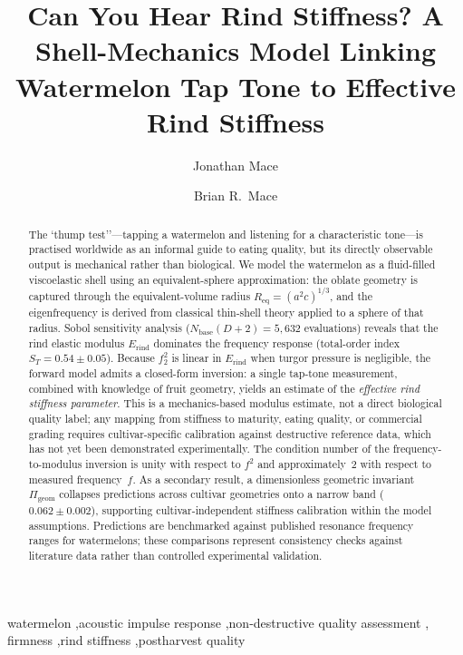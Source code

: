 \documentclass[review]{elsarticle}
\begin{document}
\begin{frontmatter}

\title{Can You Hear Rind Stiffness? A Shell-Mechanics Model Linking
Watermelon Tap Tone to Effective Rind Stiffness}

\author[msr]{Jonathan Mace}

\author[auckland]{Brian R.\ Mace}



\begin{abstract}
The `thump test''---tapping a watermelon and listening for a
characteristic tone---is practised worldwide as an informal guide to
eating quality, but its directly observable output is mechanical rather
than biological.  We model the watermelon as a fluid-filled
viscoelastic shell using an equivalent-sphere approximation: the oblate
geometry is captured through the equivalent-volume radius
$R_{\mathrm{eq}} = (a^{2}c)^{1/3}$, and the eigenfrequency is derived
from classical thin-shell theory applied to a sphere of that radius.
Sobol sensitivity analysis ($N_{\mathrm{base}}(D{+}2) = 5{,}632$
evaluations) reveals that the rind elastic modulus
$E_{\mathrm{rind}}$ dominates the frequency response (total-order
index $S_T = 0.54 \pm 0.05$).  Because $f_2^2$ is linear in
$E_{\mathrm{rind}}$ when turgor pressure is negligible, the forward
model admits a closed-form inversion: a single tap-tone measurement,
combined with knowledge of fruit geometry, yields an estimate of the
\emph{effective rind stiffness parameter}.  This is a mechanics-based
modulus estimate, not a direct biological quality label; any mapping from
stiffness to maturity, eating quality, or commercial grading requires
cultivar-specific calibration against destructive reference data, which
has not yet been demonstrated experimentally.  The condition number of
the frequency-to-modulus inversion is unity with respect to $f^2$ and
approximately~2 with respect to measured frequency~$f$.  As a
secondary result, a dimensionless geometric invariant
$\Pi_{\mathrm{geom}}$ collapses predictions across cultivar geometries
onto a narrow band ($0.062 \pm 0.002$), supporting cultivar-independent
stiffness calibration within the model assumptions.  Predictions are
benchmarked against published resonance frequency ranges for
watermelons; these comparisons represent consistency checks against
literature data rather than controlled experimental validation.
\end{abstract}

\begin{keyword}
watermelon \sep acoustic impulse response \sep non-destructive quality assessment \sep
firmness \sep rind stiffness \sep postharvest quality
\end{keyword}

\end{frontmatter}
\end{document}
